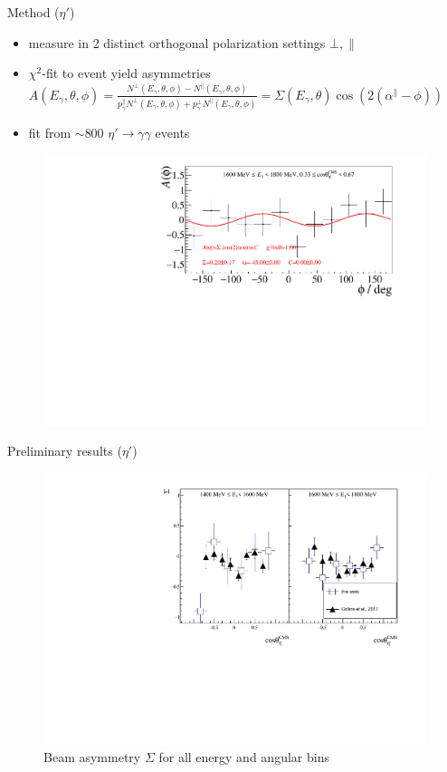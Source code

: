 \documentclass[11pt,aspectratio=169,dvipsnames]{beamer}
\begin{document}
\begin{frame}{Method ($\eta'$)}

	\begin{itemize}
		\item measure in 2 distinct orthogonal polarization settings $\bot,\parallel$
		\item $\chi^2$-fit to event yield asymmetries $A(E_\gamma,\theta,\phi)=\frac{N^\bot(E_\gamma,\theta,\phi)-N^\parallel(E_\gamma,\theta,\phi)}{p_\gamma^\parallel N^\bot(E_\gamma,\theta,\phi) + p_\gamma^\bot N^\parallel(E_\gamma,\theta,\phi)}=\Sigma(E_\gamma,\theta)\cos\left(2\left(\alpha^\parallel-\phi\right)\right)$
		\item fit from $\sim 800$ $\eta'\to\gamma\gamma$ events
	\end{itemize}
\vspace{-0.5cm}
\begin{figure}
	\centering
	\includegraphics[width=.66\linewidth]{asym_bin}
\end{figure}


\end{frame}
\begin{frame}{Preliminary results ($\eta'$)}
	\begin{figure}
		\centering
		\includegraphics[width=.9\linewidth]{sigma}
		\caption*{Beam asymmetry $\Sigma$ for all energy and angular bins}
	\end{figure}
\end{frame}
\end{document}
